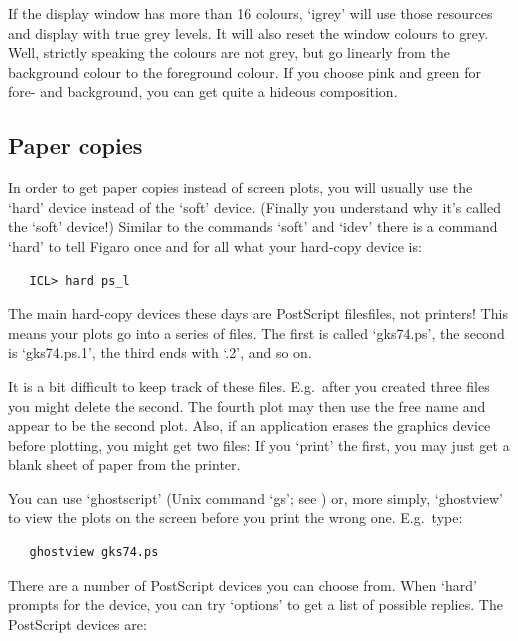    If the display window has more than 16 colours, `igrey' will use
   those resources and display with true grey levels. It will also reset
   the window colours to grey. Well, strictly speaking the colours are
   not grey, but go linearly from the background colour to the
   foreground colour. If you choose pink and green for fore- and
   background, you can get quite a hideous composition.


\subsection{\label{hardcopy}Paper copies}

   In order to get paper copies instead of screen plots, you will
   usually use the `hard' device instead of the `soft' device. (Finally
   you understand why it's called the `soft' device!) Similar to the
   commands `soft' and `idev' there is a command `hard' to tell Figaro
   once and for all what your hard-copy device is:

\begin{verbatim}
   ICL> hard ps_l
\end{verbatim}

   The main hard-copy devices these days are PostScript
   files\latorhtm{---}{-}files,
   not printers! This means your plots go into a series of files. The
   first is called `gks74.ps', the second is `gks74.ps.1', the third
   ends with `.2', and so on.

   It is a bit difficult to keep track of these files. E.g.\ after you
   created three files you might delete the second. The fourth plot may
   then use the free name and appear to be the second plot. Also, if an
   application erases the graphics device before plotting, you might get
   two files: If you `print' the first, you may just get a blank sheet
   of paper from the printer.

   You can use `ghostscript' (Unix command `gs'; see
   ) or, more simply, `ghostview' to view the
   plots on the screen before you print the wrong one.  E.g.\ type:

\begin{verbatim}
   ghostview gks74.ps
\end{verbatim}

   There are a number of PostScript devices you can choose from. When
   `hard' prompts for the device, you can try `options' to get a list of
   possible replies. The PostScript devices are:

